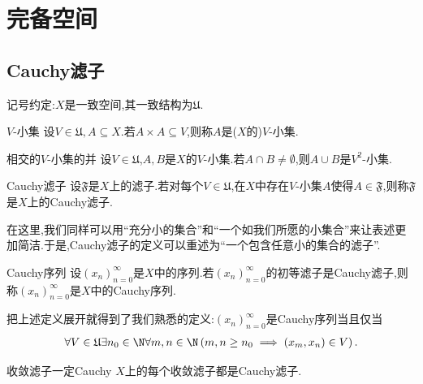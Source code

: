 \chapter{完备空间}

\section{Cauchy滤子}

记号约定:$X$是一致空间,其一致结构为$\mathfrak{U}$.

\begin{definition}{$V$-小集}{}
	设$V\in\mathfrak{U},A\subseteq X$.若$A\times A\subseteq V$,则称$A$是($X$的)$V$-小集.
\end{definition}

\begin{proposition}{相交的$V$-小集的并}{}
	设$V\in\mathfrak{U}$,$A,B$是$X$的$V$-小集.若$A\cap B\neq\emptyset$,则$A\cup B$是$V^{2}$-小集.
\end{proposition}

\begin{definition}{Cauchy滤子}{}
	设$\mathfrak{F}$是$X$上的滤子.若对每个$V\in\mathfrak{U}$,在$X$中存在$V$-小集$A$使得$A\in\mathfrak{F}$,则称$\mathfrak{F}$是$X$上的Cauchy滤子.
\end{definition}

\begin{remark}{}{}
	在这里,我们同样可以用``充分小的集合''和``一个如我们所愿的小集合''来让表述更加简洁.于是,Cauchy滤子的定义可以重述为``一个包含任意小的集合的滤子''.
\end{remark}

\begin{definition}{Cauchy序列}{}
	设$\left(x_{n}\right)_{n=0}^{\infty}$是$X$中的序列.若$\left(x_{n}\right)_{n=0}^{\infty}$的初等滤子是Cauchy滤子,则称$\left(x_{n}\right)_{n=0}^{\infty}$是$X$中的Cauchy序列.
\end{definition}

\begin{remark}{}{}
	把上述定义展开就得到了我们熟悉的定义:$\left(x_{n}\right)_{n=0}^{\infty}$是Cauchy序列当且仅当
	\begin{align*}
		\forall V\in\mathfrak{U}\exists n_{0}\in\N\forall m,n\in\N\left(m,n\geq n_{0}\implies\left(x_{m},x_{n}\right)\in V\right).
	\end{align*}
\end{remark}

\begin{proposition}{收敛滤子一定Cauchy}{}
	$X$上的每个收敛滤子都是Cauchy滤子.
\end{proposition}

